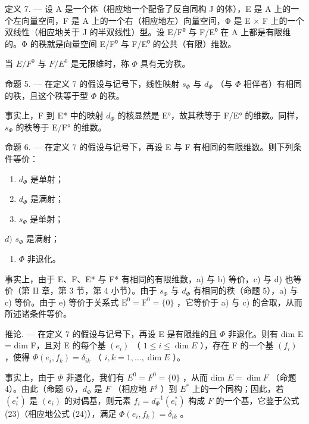 定义 7. --- 设 A 是一个体（相应地一个配备了反自同构 J 的体），E 是 A 上的一个左向量空间，F 是 A 上的一个右（相应地左）向量空间，Φ 是 E × F 上的一个双线性（相应地关于 J 的半双线性）型。设 E/F⁰ 与 F/E⁰ 在 A 上都是有限维的。Φ 的秩就是向量空间 E/F⁰ 与 F/E⁰ 的公共（有限）维数。

当 \(E/F^{0}\) 与 \(F/E^{0}\) 是无限维时，称 \(\Phi\) 具有无穷秩。

命题 5. --- 在定义 7 的假设与记号下，线性映射 \(s_{\Phi}\) 与 \(d_{\Phi}\) （与 \(\Phi\) 相伴者）有相同的秩，且这个秩等于型 \(\Phi\) 的秩。

事实上，F 到 E* 中的映射 \(d_{\Phi}\) 的核显然是 E°，故其秩等于 F/E° 的维数。同样，\(s_{\Phi}\) 的秩等于 E/F° 的维数。

命题 6. --- 在定义 7 的假设与记号下，再设 E 与 F 有相同的有限维数。则下列条件等价：

\begin{enumerate}
\def\labelenumi{\alph{enumi})}
\item
  \(d_{\Phi}\) 是单射；
\item
  \(d_{\Phi}\) 是满射；
\item
  \(s_{\Phi}\) 是单射；
\end{enumerate}

\(d)\) \(s_{\Phi}\) 是满射；

\begin{enumerate}
\def\labelenumi{\alph{enumi})}
\setcounter{enumi}{4}
\tightlist
\item
  \(\Phi\) 非退化。
\end{enumerate}

事实上，由于 E、F、E* 与 F* 有相同的有限维数，a) 与 b) 等价，c) 与 d) 也等价（第 II 章，第 3 节，第 4 小节）。由于 \(s_{\Phi}\) 与 \(d_{\Phi}\) 有相同的秩（命题 5），a) 与 c) 等价。由于 e) 等价于关系式 \(\mathrm{E}^{0} = \mathrm{F}^{0} = \{0\}\) ，它等价于 a) 与 c) 的合取，从而所述诸条件等价。

推论. --- 在定义 7 的假设与记号下，再设 E 是有限维的且 \(\Phi\) 非退化。则有 dim E = dim F，且对 E 的每个基 \((e_i)\) （ \(1 \leqslant i \leqslant \dim E\) ），存在 F 的一个基 \((f_i)\) ，使得 \(\Phi(e_i, f_k) = \delta_{ik}\) （ \(i, k = 1, \ldots, \dim E\) ）。

事实上，由于 \(\Phi\) 非退化，我们有 \(E^{0} = F^{0} = \{0\}\) ，从而 dim \(E = \dim F\) （命题 4）。由此（命题 6），\(d_{\Phi}\) 是 \(F\) （相应地 \(F^{j}\) ）到 \(E^{*}\) 上的一个同构；因此，若 \((e_{i}^{*})\) 是 \((e_{i})\) 的对偶基，则元素 \(f_{i} = d_{\Phi}^{-1}(e_{i}^{*})\) 构成 \(F\) 的一个基，它鉴于公式 (23)（相应地公式 (24)），满足 \(\Phi(e_{i}, f_{k}) = \delta_{ik}\) 。

